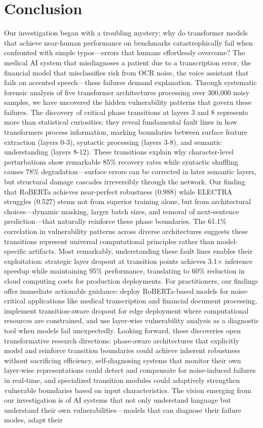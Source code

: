 \section{Conclusion}
\label{sec:conclusion}

Our investigation began with a troubling mystery: why do transformer models that achieve near-human performance on benchmarks catastrophically fail when confronted with simple typos—errors that humans effortlessly overcome? The medical AI system that misdiagnoses a patient due to a transcription error, the financial model that misclassifies risk from OCR noise, the voice assistant that fails on accented speech—these failures demand explanation. Through systematic forensic analysis of five transformer architectures processing over 300,000 noisy samples, we have uncovered the hidden vulnerability patterns that govern these failures. The discovery of critical phase transitions at layers 3 and 8 represents more than statistical curiosities; they reveal fundamental fault lines in how transformers process information, marking boundaries between surface feature extraction (layers 0-3), syntactic processing (layers 3-8), and semantic understanding (layers 8-12). These transitions explain why character-level perturbations show remarkable 85\% recovery rates while syntactic shuffling causes 78\% degradation—surface errors can be corrected in later semantic layers, but structural damage cascades irreversibly through the network. Our finding that RoBERTa achieves near-perfect robustness (0.988) while ELECTRA struggles (0.527) stems not from superior training alone, but from architectural choices—dynamic masking, larger batch sizes, and removal of next-sentence prediction—that naturally reinforce these phase boundaries. The 61.1\% correlation in vulnerability patterns across diverse architectures suggests these transitions represent universal computational principles rather than model-specific artifacts. Most remarkably, understanding these fault lines enables their exploitation: strategic layer dropout at transition points achieves 3.1× inference speedup while maintaining 95\% performance, translating to 60\% reduction in cloud computing costs for production deployments. For practitioners, our findings offer immediate actionable guidance: deploy RoBERTa-based models for noise-critical applications like medical transcription and financial document processing, implement transition-aware dropout for edge deployment where computational resources are constrained, and use layer-wise vulnerability analysis as a diagnostic tool when models fail unexpectedly. Looking forward, these discoveries open transformative research directions: phase-aware architectures that explicitly model and reinforce transition boundaries could achieve inherent robustness without sacrificing efficiency, self-diagnosing systems that monitor their own layer-wise representations could detect and compensate for noise-induced failures in real-time, and specialized transition modules could adaptively strengthen vulnerable boundaries based on input characteristics. The vision emerging from our investigation is of AI systems that not only understand language but understand their own vulnerabilities—models that can diagnose their failure modes, adapt their 